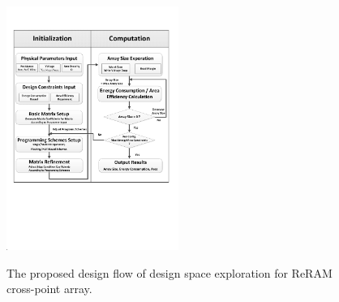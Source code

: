 \begin{figure}[!t]
\centering
  \includegraphics[width=0.5\textwidth]{./figures/FlowChart.pdf}\\
  \caption{The proposed design flow of design space exploration for ReRAM cross-point array.}\label{fig:FlowChart}
  \vspace{-10pt}
\end{figure}
